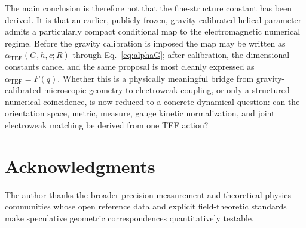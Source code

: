 \documentclass[10pt,twocolumn]{article}
\newcommand{\TEF}{\mathrm{TEF}}
\begin{document}
The main conclusion is therefore not that the fine-structure constant has been derived.  It is that an
earlier, publicly frozen, gravity-calibrated helical parameter admits a particularly compact conditional
map to the electromagnetic numerical regime.  Before the gravity calibration is imposed the map may
be written as $\alpha_{\TEF}(G,h,c;R)$ through Eq.~\eqref{eq:alphaG}; after calibration, the dimensional
constants cancel and the same proposal is most cleanly expressed as $\alpha_{\TEF}=F(q)$.  Whether this
is a physically meaningful bridge from gravity-calibrated microscopic geometry to electroweak coupling,
or only a structured numerical coincidence, is now reduced to a concrete dynamical question: can the
orientation space, metric, measure, gauge kinetic normalization, and joint electroweak matching be
derived from one TEF action?

\section*{Acknowledgments}
The author thanks the broader precision-measurement and theoretical-physics communities whose open
reference data and explicit field-theoretic standards make speculative geometric correspondences
quantitatively testable.
\end{document}
